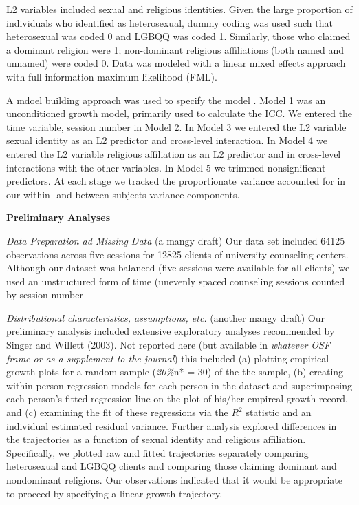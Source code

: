 \documentclass[
  english,
]{book}
\begin{document}
L2 variables included sexual and religious identities. Given the large proportion of individuals who identified as heterosexual, dummy coding was used such that heterosexual was coded 0 and LGBQQ was coded 1. Similarly, those who claimed a dominant religion were 1; non-dominant religious affiliations (both named and unnamed) were coded 0. Data was modeled with a linear mixed effects approach with full information maximum likelihood (FML).

A mdoel building approach was used to specify the model \citep{hancock_hierarchical_2010, singer_applied_2003}. Model 1 was an unconditioned growth model, primarily used to calculate the ICC. We entered the time variable, session number in Model 2. In Model 3 we entered the L2 variable sexual identity as an L2 predictor and cross-level interaction. In Model 4 we entered the L2 variable religious affiliation as an L2 predictor and in cross-level interactions with the other variables. In Model 5 we trimmed nonsignificant predictors. At each stage we tracked the proportionate variance accounted for in our within- and between-subjects variance components.

\textbf{Preliminary Analyses}

\emph{Data Preparation ad Missing Data} (a mangy draft) Our data set included 64125 observations across five sessions for 12825 clients of university counseling centers. Although our dataset was balanced (five sessions were available for all clients) we used an unstructured form of time (unevenly spaced counseling sessions counted by session number

\emph{Distributional characteristics, assumptions, etc.} (another mangy draft) Our preliminary analysis included extensive exploratory analyses recommended by Singer and Willett (2003). Not reported here (but available in \emph{whatever OSF frame or as a supplement to the journal}) this included (a) plotting empirical growth plots for a random sample (\emph{20\%}n* = 30) of the the sample, (b) creating within-person regression models for each person in the dataset and superimposing each person's fitted regression line on the plot of his/her empircal growth record, and (c) examining the fit of these regressions via the \(R^2\) statistic and an individual estimated residual variance. Further analysis explored differences in the trajectories as a function of sexual identity and religious affiliation. Specifically, we plotted raw and fitted trajectories separately comparing heterosexual and LGBQQ clients and comparing those claiming dominant and nondominant religions. Our observations indicated that it would be appropriate to proceed by specifying a linear growth trajectory.
\end{document}
